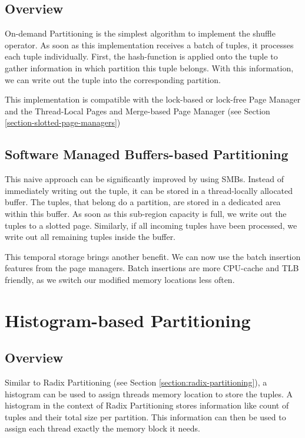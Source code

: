 \subsection{Overview}
On-demand Partitioning is the simplest algorithm to implement the shuffle operator.
As soon as this implementation receives a batch of tuples, it processes each tuple individually.
First, the hash-function is applied onto the tuple to gather information in which partition this tuple belongs.
With this information, we can write out the tuple into the corresponding partition.

This implementation is compatible with the lock-based or lock-free Page Manager and the Thread-Local Pages and Merge-based Page Manager (see Section \ref{section-slotted-page-managers})

\subsection{Software Managed Buffers-based Partitioning}

This naive approach can be significantly improved by using \acfp{SMB}.
Instead of immediately writing out the tuple, it can be stored in a thread-locally allocated buffer.
The tuples, that belong do a partition, are stored in a dedicated area within this buffer.
As soon as this sub-region capacity is full, we write out the tuples to a slotted page.
Similarly, if all incoming tuples have been processed, we write out all remaining tuples inside the buffer.

This temporal storage brings another benefit.
We can now use the batch insertion features from the page managers.
Batch insertions are more \ac{CPU}-cache and \ac{TLB} friendly, as we switch our modified memory locations less often.

\section{Histogram-based Partitioning}
\subsection{Overview}
Similar to Radix Partitioning (see Section \ref{section:radix-partitioning}), a histogram can be used to assign threads memory location to store the tuples.
A histogram in the context of Radix Partitioning stores information like count of tuples and their total size per partition.
This information can then be used to assign each thread exactly the memory block it needs.

